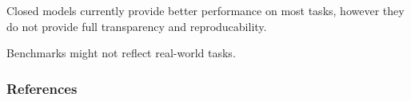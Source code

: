 \documentclass[11pt]{article}
\begin{document}


Closed models currently provide better performance on most tasks, however they do not provide full transparency and reproducability.


Benchmarks might not reflect real-world tasks.



\subsubsection{References}



\end{document}
